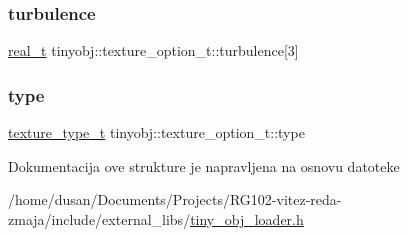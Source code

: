 \subsubsection{\texorpdfstring{turbulence}{turbulence}}
{\footnotesize\ttfamily \hyperlink{namespacetinyobj_ad5ca7469ff56bf0d8423120cfd99adce}{real\+\_\+t} tinyobj\+::texture\+\_\+option\+\_\+t\+::turbulence\mbox{[}3\mbox{]}}

\mbox{\label{structtinyobj_1_1texture__option__t_ae93ebf5f70b1b3e3c1de58a257157e00}} 
\subsubsection{\texorpdfstring{type}{type}}
{\footnotesize\ttfamily \hyperlink{namespacetinyobj_a5c9f207e1f880a48bac0a3b69f16d7f8}{texture\+\_\+type\+\_\+t} tinyobj\+::texture\+\_\+option\+\_\+t\+::type}



Dokumentacija ove strukture je napravljena na osnovu datoteke \begin{DoxyCompactItemize}
\item 
/home/dusan/\+Documents/\+Projects/\+R\+G102-\/vitez-\/reda-\/zmaja/include/external\+\_\+libs/\hyperlink{tiny__obj__loader_8h}{tiny\+\_\+obj\+\_\+loader.\+h}\end{DoxyCompactItemize}
